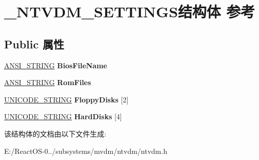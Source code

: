 \hypertarget{struct___n_t_v_d_m___s_e_t_t_i_n_g_s}{}\section{\+\_\+\+N\+T\+V\+D\+M\+\_\+\+S\+E\+T\+T\+I\+N\+G\+S结构体 参考}
\label{struct___n_t_v_d_m___s_e_t_t_i_n_g_s}
\subsection*{Public 属性}
\begin{DoxyCompactItemize}
\item 
\mbox{\label{struct___n_t_v_d_m___s_e_t_t_i_n_g_s_af9e4423f7ced04f5e6ee82cb3e0fcec8}} 
\hyperlink{struct___a_n_s_i___s_t_r_i_n_g}{A\+N\+S\+I\+\_\+\+S\+T\+R\+I\+NG} {\bfseries Bios\+File\+Name}
\item 
\mbox{\label{struct___n_t_v_d_m___s_e_t_t_i_n_g_s_ad93917e3840dfceb09a75450df0586df}} 
\hyperlink{struct___a_n_s_i___s_t_r_i_n_g}{A\+N\+S\+I\+\_\+\+S\+T\+R\+I\+NG} {\bfseries Rom\+Files}
\item 
\mbox{\label{struct___n_t_v_d_m___s_e_t_t_i_n_g_s_a9430da87f16a0e6819afcf58861d76f1}} 
\hyperlink{struct___u_n_i_c_o_d_e___s_t_r_i_n_g}{U\+N\+I\+C\+O\+D\+E\+\_\+\+S\+T\+R\+I\+NG} {\bfseries Floppy\+Disks} \mbox{[}2\mbox{]}
\item 
\mbox{\label{struct___n_t_v_d_m___s_e_t_t_i_n_g_s_a035611774130a32e313750c30a44c46a}} 
\hyperlink{struct___u_n_i_c_o_d_e___s_t_r_i_n_g}{U\+N\+I\+C\+O\+D\+E\+\_\+\+S\+T\+R\+I\+NG} {\bfseries Hard\+Disks} \mbox{[}4\mbox{]}
\end{DoxyCompactItemize}


该结构体的文档由以下文件生成\+:\begin{DoxyCompactItemize}
\item 
E\+:/\+React\+O\+S-\/0../subsystems/mvdm/ntvdm/ntvdm.\+h\end{DoxyCompactItemize}
